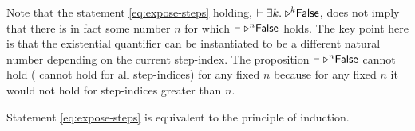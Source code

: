 \begin{remark}
  Note that the statement \eqref{eq:expose-steps} holding, \ie{} $\vdash \exists k.\; {\mathop{{\triangleright}}}^{k} \textsf{\upshape False}$, does not imply that there is in fact some number $n$ for which $\vdash {\mathop{{\triangleright}}}^{n} \textsf{\upshape False}$ holds.
  The key point here is that the existential quantifier can be instantiated to be a different natural number depending on the current step-index.
  The proposition $\vdash {\mathop{{\triangleright}}}^{n} \textsf{\upshape False}$ cannot hold (\ie{} cannot hold for all step-indices) for any fixed $n$ because for any fixed $n$ it would not hold for step-indices greater than $n$.
\end{remark}

\begin{theorem}
  Statement \eqref{eq:expose-steps} is equivalent to the principle of  induction.
\end{theorem}

